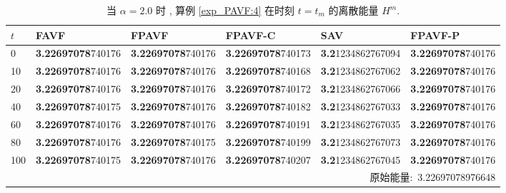  \begin{table}[H]\footnotesize
	\centering
	\caption{当 $\alpha=2.0$ 时 , 算例 \ref{exp_PAVF:4}  在时刻 $t=t_{m}$ 的离散能量 $H^{m}$.}
	\begin{tabular}{p{0.45cm}p{2.45cm}p{2.45cm}p{2.45cm}p{2.45cm}p{2.45cm}}
	  \toprule
       $t$   &FAVF   &FPAVF   &FPAVF-C   &SAV   &FPAVF-P\\
	\midrule
	0     & \textbf{3.22697078}740176 & \textbf{3.22697078}740176 & \textbf{3.22697078}740173 & \textbf{3.2}1234862767094 & \textbf{3.22697078}740176 \\
	10    & \textbf{3.22697078}740176 & \textbf{3.22697078}740176 & \textbf{3.22697078}740168 & \textbf{3.2}1234862767062 & \textbf{3.22697078}740176 \\
	20    & \textbf{3.22697078}740176 & \textbf{3.22697078}740176 & \textbf{3.22697078}740172 & \textbf{3.2}1234862767066 & \textbf{3.22697078}740176 \\
	40    & \textbf{3.22697078}740175 & \textbf{3.22697078}740176 & \textbf{3.22697078}740182 & \textbf{3.2}1234862767033 & \textbf{3.22697078}740176 \\
	60    & \textbf{3.22697078}740176 & \textbf{3.22697078}740176 & \textbf{3.22697078}740191 & \textbf{3.2}1234862767035 & \textbf{3.22697078}740176 \\
	80    & \textbf{3.22697078}740176 & \textbf{3.22697078}740175 & \textbf{3.22697078}740199 & \textbf{3.2}1234862767073 & \textbf{3.22697078}740176 \\
	100   & \textbf{3.22697078}740175 & \textbf{3.22697078}740176 & \textbf{3.22697078}740207 & \textbf{3.2}1234862767045 & \textbf{3.22697078}740176 \\
	\midrule
	  \multicolumn{6}{r}{原始能量:~3.22697078976648} \\
	  \bottomrule
	  \end{tabular}\label{tab_PAVF:4-1}%
  \end{table}%


